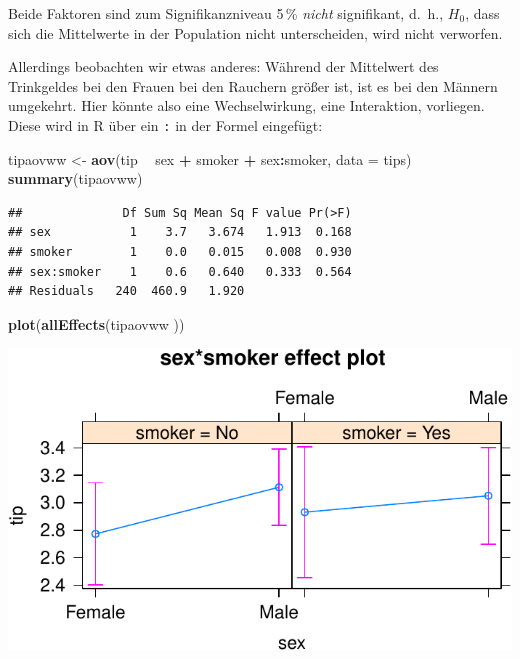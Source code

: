 \documentclass[12pt,ngerman,paper=a4,pagesize,DIV=13]{scrreprt}
\newenvironment{Shaded}{\begin{snugshade}}{\end{snugshade}}
\newcommand{\DataTypeTok}[1]{\textcolor[rgb]{0.13,0.29,0.53}{#1}}
\newcommand{\KeywordTok}[1]{\textcolor[rgb]{0.13,0.29,0.53}{\textbf{#1}}}
\newcommand{\NormalTok}[1]{#1}
\newcommand{\OperatorTok}[1]{\textcolor[rgb]{0.81,0.36,0.00}{\textbf{#1}}}
\newcommand{\StringTok}[1]{\textcolor[rgb]{0.31,0.60,0.02}{#1}}
\begin{document}
Beide Faktoren sind zum Signifikanzniveau 5\(\,\)\% \emph{nicht}
signifikant, d.~h., \(H_0\), dass sich die Mittelwerte in der Population
nicht unterscheiden, wird nicht verworfen.

Allerdings beobachten wir etwas anderes: Während der Mittelwert des
Trinkgeldes bei den Frauen bei den Rauchern größer ist, ist es bei den
Männern umgekehrt. Hier könnte also eine Wechselwirkung, eine
Interaktion, vorliegen. Diese wird in R über ein \texttt{:} in der
Formel eingefügt:

\begin{Shaded}
\begin{Highlighting}[]
\NormalTok{tipaovww <-}\StringTok{ }\KeywordTok{aov}\NormalTok{(tip }\OperatorTok{~}\StringTok{ }\NormalTok{sex }\OperatorTok{+}\StringTok{ }\NormalTok{smoker }\OperatorTok{+}\StringTok{ }\NormalTok{sex}\OperatorTok{:}\NormalTok{smoker, }\DataTypeTok{data =}\NormalTok{ tips)}
\KeywordTok{summary}\NormalTok{(tipaovww)}
\end{Highlighting}
\end{Shaded}

\begin{verbatim}
##              Df Sum Sq Mean Sq F value Pr(>F)
## sex           1    3.7   3.674   1.913  0.168
## smoker        1    0.0   0.015   0.008  0.930
## sex:smoker    1    0.6   0.640   0.333  0.564
## Residuals   240  460.9   1.920
\end{verbatim}

\begin{Shaded}
\begin{Highlighting}[]
\KeywordTok{plot}\NormalTok{(}\KeywordTok{allEffects}\NormalTok{(tipaovww ))}
\end{Highlighting}
\end{Shaded}

\includegraphics{DatenerhebungStatistik-Uebung_files/figure-latex/unnamed-chunk-156-1.pdf}
\end{document}
